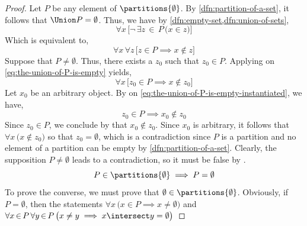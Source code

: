\begin{proof}
    Let \( P \) be any element of \( \partitions{\emptyset} \).
    By \cref{dfn:partition-of-a-set}, it follows that \( \Union P = \emptyset \).
    Thus, we have by \cref{dfn:empty-set,dfn:union-of-sets},
    \begin{equation*}
        \forall x \, \big[ \lnot \, \exists z\,{\in}\,P \, \big( x \in z \big) \big]
    \end{equation*}
    Which is equivalent to,
    \begin{equation}
        \label{eq:the-union-of-P-is-empty}
        \forall x \, \forall z \, \big[ z \in P \implies x \notin z \big]
    \end{equation}
    Suppose that \( P \neq \emptyset \). Thus, there exists a \( z_{0} \) such that \( z_{0} \in P \).
    Applying  on \eqref{eq:the-union-of-P-is-empty} yields,
    \begin{equation}
        \label{eq:the-union-of-P-is-empty-instantiated}
        \forall x \, \big[ z_{0} \in P \implies x \notin z_{0} \big]
    \end{equation}
    Let \( x_{0} \) be an arbitrary object. By  on \eqref{eq:the-union-of-P-is-empty-instantiated},
    we have,
    \begin{equation*}
        z_{0} \in P \implies x_{0} \notin z_{0}
    \end{equation*}
    Since \( z_{0} \in P \), we conclude by  that \( x_{0} \notin z_{0} \). Since \( x_{0} \) is arbitrary,
    it follows that \( \forall x \, \big( x \notin z_{0} \big) \) so that \( z_{0} = \emptyset \), which is a contradiction
    since \( P \) is a partition and no element of a partition can be empty by \cref{dfn:partition-of-a-set}. Clearly, the
    supposition \( P \neq \emptyset \) leads to a contradiction, so it must be false by .
    \begin{equation*}
        P \in \partitions{\emptyset} \implies P = \emptyset
    \end{equation*}
    To prove the converse, we must prove that \( \emptyset \in \partitions{\emptyset} \).
    Obviously, if \( P = \emptyset \), then the statements \( \forall x \, \big( x \in P \implies x \neq \emptyset \big) \)
    and \( \forall x\,{\in}\,P \, \forall y\,{\in}\,P \, \big( x \neq y \implies x \intersect y = \emptyset \big) \)

\end{proof}
